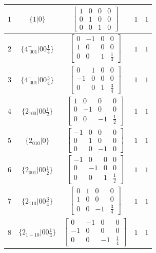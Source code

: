 \documentclass[fleqn,8pt]{jsarticle}
\begin{document}
\begin{longtable}{ccccc}
$ 1 $ & $ \{1|0\} $ & $ \begin{bmatrix} 1 & 0 & 0 & 0 \\ 0 & 1 & 0 & 0 \\ 0 & 0 & 1 & 0 \end{bmatrix} $ & $ 1 $ & $ 1 $ \\ \hline
$ 2 $ & $ \{4^{+}_{\,\,001}|0 0 \frac{1}{4}\} $ & $ \begin{bmatrix} 0 & -1 & 0 & 0 \\ 1 & 0 & 0 & 0 \\ 0 & 0 & 1 & \frac{1}{4} \end{bmatrix} $ & $ 1 $ & $ 1 $ \\ \hline
$ 3 $ & $ \{4^{-}_{\,\,001}|0 0 \frac{3}{4}\} $ & $ \begin{bmatrix} 0 & 1 & 0 & 0 \\ -1 & 0 & 0 & 0 \\ 0 & 0 & 1 & \frac{3}{4} \end{bmatrix} $ & $ 1 $ & $ 1 $ \\ \hline
$ 4 $ & $ \{2{}_{100}|0 0 \frac{1}{2}\} $ & $ \begin{bmatrix} 1 & 0 & 0 & 0 \\ 0 & -1 & 0 & 0 \\ 0 & 0 & -1 & \frac{1}{2} \end{bmatrix} $ & $ 1 $ & $ 1 $ \\ \hline
$ 5 $ & $ \{2{}_{010}|0\} $ & $ \begin{bmatrix} -1 & 0 & 0 & 0 \\ 0 & 1 & 0 & 0 \\ 0 & 0 & -1 & 0 \end{bmatrix} $ & $ 1 $ & $ 1 $ \\ \hline
$ 6 $ & $ \{2{}_{001}|0 0 \frac{1}{2}\} $ & $ \begin{bmatrix} -1 & 0 & 0 & 0 \\ 0 & -1 & 0 & 0 \\ 0 & 0 & 1 & \frac{1}{2} \end{bmatrix} $ & $ 1 $ & $ 1 $ \\ \hline
$ 7 $ & $ \{2{}_{110}|0 0 \frac{3}{4}\} $ & $ \begin{bmatrix} 0 & 1 & 0 & 0 \\ 1 & 0 & 0 & 0 \\ 0 & 0 & -1 & \frac{3}{4} \end{bmatrix} $ & $ 1 $ & $ 1 $ \\ \hline
$ 8 $ & $ \{2{}_{1-10}|0 0 \frac{1}{4}\} $ & $ \begin{bmatrix} 0 & -1 & 0 & 0 \\ -1 & 0 & 0 & 0 \\ 0 & 0 & -1 & \frac{1}{4} \end{bmatrix} $ & $ 1 $ & $ 1 $ \\ \hline

\end{longtable}
\end{document}

